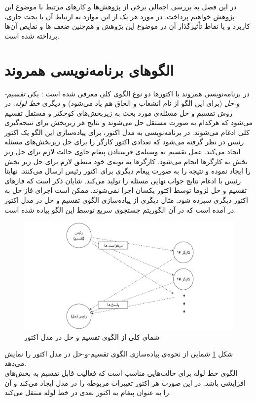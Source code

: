 در این فصل به بررسی اجمالی برخی از پژوهش‌ها و کارهای مرتبط با موضوع این پژوهش خواهیم پرداخت. در مورد هر یک از این موارد به ارتباط آن با بحث جاری، کاربرد و یا نقاط تأثیرگذار آن در موضوع این پژوهش و هم‌چنین ضعف ها و نقایص آن‌ها پرداخته شده است. 
\section{الگوهای برنامه‌نویسی همروند}
\label{section:actorPatterns}
در برنامه‌نویسی همروند با اکتور‌ها دو نوع الگوی کلی معرفی شده است \cite{Agha1990}: یکی  \textit{\gls{تقسیم-و-حل}} (برای این الگو از نام انشعاب و الحاق هم  یاد می‌شود) و دیگری \textit{\gls{خط لوله}}. 
در روش تقسیم-و-حل مسئله‌ی مورد بحث به زیربخش‌های کوچکتر و مستقل تقسیم می‌شود که هرکدام به صورت مستقل حل می‌شوند و نتایج هر زیربخش برای نتیجه‌گیری کلی ادغام می‌شوند. در برنامه‌نویسی به مدل اکتور، برای پیاده‌سازی این الگو یک اکتور رئیس در نظر گرفته می‌شود که تعدادی اکتور کارگر را برای حل زیربخش‌های مسئله ایجاد می‌کند. عمل تقسیم به وسیله‌ی فرستادن پیغام‌ حاوی حالت لازم برای حل زیر بخش به کارگر‌ها انجام می‌شود. کارگرها به نوبه‌ی خود منطق لازم برای حل زیر بخش را ایجاد نموده و نتیجه را به صورت پیغام دیگری برای اکتور رئیس ارسال می‌کنند. نهایتا رئیس با ادغام نتایج جواب نهایی 
مسئله را تولید می‌کند. شایان ذکر است که فازهای تقسیم و حل لزوما توسط اکتور یکسان اجرا نمی‌شوند. ممکن است اجرای فاز حل به اکتور دیگری سپرده شود.\cite{Feng08scalablemodels}
مثال دیگری از پیاده‌سازی الگوی تقسیم-و-حل در مدل اکتور  در \cite{Feng08scalablemodels} آمده است که در آن الگوریتم جستجوی سریع توسط این الگو پیاده شده است.
\begin{figure}
    \begin{center}
	\includegraphics[width=16cm]{3-RelatedWork/Figures/Divide_and_Conquer.pdf}
    \end{center}
    \caption{\label{fig:divide_conquer}  شمای کلی از الگوی تقسیم-و-حل در مدل اکتور }
\end{figure}
شکل \ref{fig:divide_conquer} شمایی از نحوه‌ی پیاده‌سازی الگوی تقسیم-و-حل در مدل اکتور را نمایش می‌دهد.\\
الگوی خط لوله برای حالت‌هایی مناسب است که فعالیت قابل تقسیم به بخش‌های افزایشی باشد. در این صورت هر اکتور تغییرات مربوطه را در مدل ایجاد می‌کند و آن را به عنوان پیغام به اکتور بعدی در خط لوله منتقل می‌کند.


